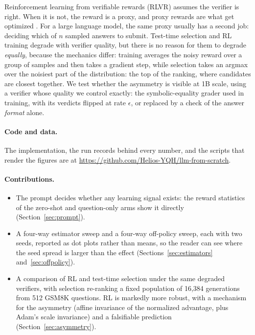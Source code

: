 \documentclass{article}
\begin{document}
Reinforcement learning from verifiable rewards (RLVR) assumes the verifier is right. When it is not, the reward is a proxy, and proxy rewards are what get optimized \citep{amodei2016concrete,skalse2022defining,gao2023scaling}. For a large language model, the same proxy usually has a second job: deciding which of $n$ sampled answers to submit. Test-time selection and RL training degrade with verifier quality, but there is no reason for them to degrade \emph{equally}, because the mechanics differ: training averages the noisy reward over a group of samples and then takes a gradient step, while selection takes an argmax over the noisiest part of the distribution: the top of the ranking, where candidates are closest together. We test whether the asymmetry is visible at 1B scale, using a verifier whose quality we control exactly: the symbolic-equality grader used in training, with its verdicts flipped at rate $\epsilon$, or replaced by a check of the answer \emph{format} alone.

\paragraph{Code and data.} The implementation, the run records behind every number, and the scripts that render the figures are at \url{https://github.com/Helios-YQH/llm-from-scratch}.

\paragraph{Contributions.}
\begin{itemize}
  \item The prompt decides whether any learning signal exists: the reward statistics of the zero-shot and question-only arms show it directly (Section~\ref{sec:prompt}).
  \item A four-way estimator sweep and a four-way off-policy sweep, each with two seeds, reported as dot plots rather than means, so the reader can see where the seed spread is larger than the effect (Sections~\ref{sec:estimators} and~\ref{sec:offpolicy}).
  \item A comparison of RL and test-time selection under the same degraded verifiers, with selection re-ranking a fixed population of 16{,}384 generations from 512 GSM8K questions. RL is markedly more robust, with a mechanism for the asymmetry (affine invariance of the normalized advantage, plus Adam's scale invariance) and a falsifiable prediction (Section~\ref{sec:asymmetry}).
\end{itemize}
\end{document}
